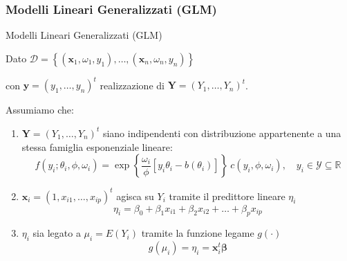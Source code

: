 \documentclass[pdf, aspectratio=169, xcolor=dvipsnames]{beamer}\usepackage[]{graphicx}\usepackage[]{color}
\theoremstyle{definition}
\begin{document}
\begin{frame}
\frametitle{Modelli Lineari Generalizzati (GLM)}
\fontsize{9pt}{11pt}\selectfont


\begin{block}{Modelli Lineari Generalizzati (GLM)}
  
  Dato $\mathcal{D} = \left\{ (\boldsymbol{x}_1, \omega_1, y_1), \dots,  (\boldsymbol{x}_n, \omega_n, y_n) \right\}$
  
  con $\boldsymbol{y} = (y_1, \dots, y_n)^t$ realizzazione di $\boldsymbol{Y} = (Y_1, \dots, Y_n)^t$.
  
  \vspace{0.2cm}
  Assumiamo che:
  \begin{enumerate}
    \item $\boldsymbol{Y} = (Y_1, \dots, Y_n)^t$ siano indipendenti con distribuzione appartenente a una stessa famiglia esponenziale lineare:
    $$f(y_i; \theta_i, \phi, \omega_i) = \exp{\left\{ \frac{\omega_i}{\phi} \left[y_i\theta_i - b(\theta_i) \right] \right\}} \ c(y_i, \phi, \omega_i), \quad y_i\in \mathcal{Y}\subseteq\mathbb{R}$$
    \item $\boldsymbol{x}_i = \left(1, x_{i1}, \dots, x_{ip} \right)^t$ agisca su $Y_i$ tramite il predittore lineare $\eta_i$
    $$\eta_i = \beta_0 + \beta_1 x_{i1} + \beta_2 x_{i2} + \dots + \beta_p x_{ip}$$
    \item $\eta_i$ sia legato a $\mu_i=E(Y_i)$ tramite la funzione legame $g(\cdot)$
    $$g(\mu_i) = \eta_i = \boldsymbol{x}_i^t \boldsymbol{\beta}$$
  \end{enumerate}
\end{block}

\end{frame}
\end{document}
